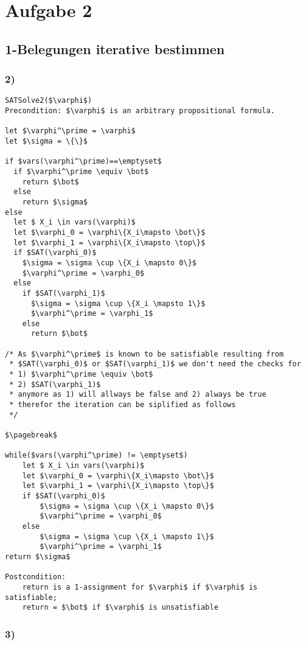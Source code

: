 \section*{Aufgabe 2}

\subsection*{1-Belegungen iterative bestimmen}

\subsubsection*{2)}
\begin{lstlisting}
SATSolve2($\varphi$)
Precondition: $\varphi$ is an arbitrary propositional formula.
  
let $\varphi^\prime = \varphi$
let $\sigma = \{\}$
  
if $vars(\varphi^\prime)==\emptyset$
  if $\varphi^\prime \equiv \bot$
    return $\bot$
  else
    return $\sigma$
else
  let $ X_i \in vars(\varphi)$
  let $\varphi_0 = \varphi\{X_i\mapsto \bot\}$
  let $\varphi_1 = \varphi\{X_i\mapsto \top\}$
  if $SAT(\varphi_0)$
    $\sigma = \sigma \cup \{X_i \mapsto 0\}$  
    $\varphi^\prime = \varphi_0$	 
  else	 
    if $SAT(\varphi_1)$
      $\sigma = \sigma \cup \{X_i \mapsto 1\}$  
      $\varphi^\prime = \varphi_1$	 
    else
      return $\bot$

/* As $\varphi^\prime$ is known to be satisfiable resulting from
 * $SAT(\varphi_0)$ or $SAT(\varphi_1)$ we don't need the checks for
 * 1) $\varphi^\prime \equiv \bot$
 * 2) $SAT(\varphi_1)$
 * anymore as 1) will allways be false and 2) always be true
 * therefor the iteration can be siplified as follows
 */
 
$\pagebreak$

while($vars(\varphi^\prime) != \emptyset$)
	let $ X_i \in vars(\varphi)$
	let $\varphi_0 = \varphi\{X_i\mapsto \bot\}$
	let $\varphi_1 = \varphi\{X_i\mapsto \top\}$
	if $SAT(\varphi_0)$
		$\sigma = \sigma \cup \{X_i \mapsto 0\}$  
		$\varphi^\prime = \varphi_0$	 
	else	 
		$\sigma = \sigma \cup \{X_i \mapsto 1\}$  
		$\varphi^\prime = \varphi_1$
return $\sigma$
  		
Postcondition: 
  	return is a 1-assignment for $\varphi$ if $\varphi$ is satisfiable; 
  	return = $\bot$ if $\varphi$ is unsatisfiable
\end{lstlisting}


\subsubsection*{3)}

